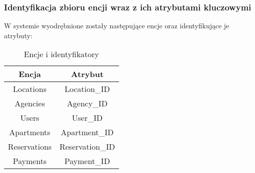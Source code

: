 \documentclass[polish, 11pt]{article}
\begin{document}
        \subsubsection{Identyfikacja zbioru encji wraz z ich atrybutami kluczowymi}
            W systemie wyodrębnione zostały następujące encje oraz identyfikujące je atrybuty:
            \begin{table}[h]
                \centering
                \caption{Encje i identyfikatory}\label{tab:entitiesID}
                \begin{tabular}{cc}\toprule
                    Encja   	    &	Atrybut	\\\midrule
                    Locations	    &	Location\_ID	\\
                    Agencies	    &	Agency\_ID	\\
                    Users   	    &	User\_ID	\\
                    Apartments	    &	Apartment\_ID	\\
                    Reservations	&	Reservation\_ID	\\
                    Payments	    &	Payment\_ID	\\
                \bottomrule
                \end{tabular}
            \end{table}
\end{document}
